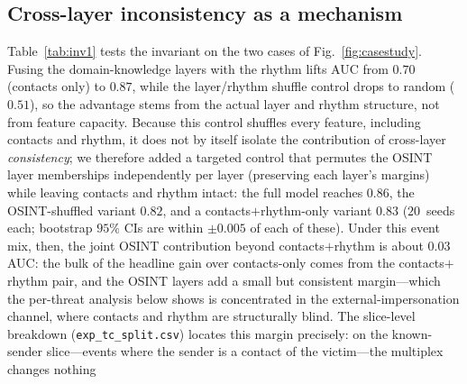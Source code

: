 \documentclass[conference]{IEEEtran}
\begin{document}
\subsection{Cross-layer inconsistency as a mechanism}
\label{sec:mechanism}
Table~\ref{tab:inv1} tests the invariant on the two cases of Fig.~\ref{fig:casestudy}. Fusing the
domain-knowledge layers with the rhythm lifts AUC from $0.70$ (contacts only) to $0.87$, while the
layer/rhythm shuffle control drops to random ($0.51$), so the advantage stems from the actual layer and
rhythm structure, not from feature capacity. Because this control shuffles every feature, including contacts
and rhythm, it does not by itself isolate the contribution of cross-layer \emph{consistency}; we therefore
added a targeted control that permutes the OSINT layer memberships independently per layer (preserving each
layer's margins) while leaving contacts and rhythm intact: the full model reaches $0.86$, the
OSINT-shuffled variant $0.82$, and a contacts$+$rhythm-only variant $0.83$ ($20$~seeds each; bootstrap
$95\%$ CIs are within $\pm0.005$ of each of these). Under this
event mix, then, the joint OSINT contribution beyond contacts$+$rhythm is about $0.03$ AUC: the bulk of the
headline gain over contacts-only comes from the contacts$+$rhythm pair, and the OSINT layers add a small but
consistent margin---which the per-threat analysis below shows is concentrated in the external-impersonation
channel, where contacts and rhythm are structurally blind.
The slice-level breakdown (\texttt{exp\_tc\_split.csv}) locates this margin precisely: on the
known-sender slice---events where the sender is a contact of the victim---the multiplex changes nothing
\end{document}
